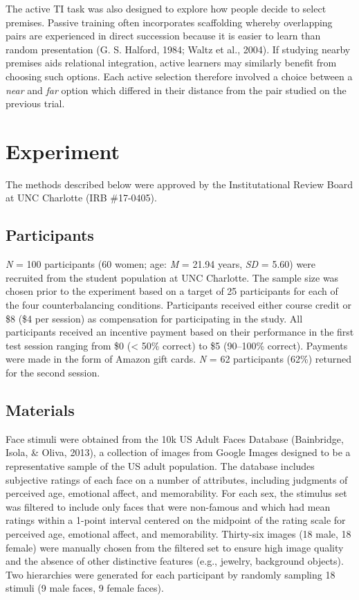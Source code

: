 \documentclass[floatsintext,man]{apa6}
\theoremstyle{definition}
\theoremstyle{definition}
\theoremstyle{definition}
\theoremstyle{remark}
\begin{document}
The active TI task was also designed to explore how people decide to
select premises. Passive training often incorporates scaffolding whereby
overlapping pairs are experienced in direct succession because it is
easier to learn than random presentation (G. S. Halford, 1984; Waltz et
al., 2004). If studying nearby premises aids relational integration,
active learners may similarly benefit from choosing such options. Each
active selection therefore involved a choice between a \emph{near} and
\emph{far} option which differed in their distance from the pair studied
on the previous trial.

\section{Experiment}\label{experiment}

The methods described below were approved by the Institutational Review
Board at UNC Charlotte (IRB \#17-0405).

\subsection{Participants}\label{participants}

\emph{N} = 100 participants (60 women; age: \emph{M} = 21.94 years,
\emph{SD} = 5.60) were recruited from the student population at UNC
Charlotte. The sample size was chosen prior to the experiment based on a
target of 25 participants for each of the four counterbalancing
conditions. Participants received either course credit or \$8 (\$4 per
session) as compensation for participating in the study. All
participants received an incentive payment based on their performance in
the first test session ranging from \$0 (\textless{} 50\% correct) to
\$5 (90--100\% correct). Payments were made in the form of Amazon gift
cards. \emph{N} = 62 participants (62\%) returned for the second
session.

\subsection{Materials}\label{materials}

Face stimuli were obtained from the 10k US Adult Faces Database
(Bainbridge, Isola, \& Oliva, 2013), a collection of images from Google
Images designed to be a representative sample of the US adult
population. The database includes subjective ratings of each face on a
number of attributes, including judgments of perceived age, emotional
affect, and memorability. For each sex, the stimulus set was filtered to
include only faces that were non-famous and which had mean ratings
within a 1-point interval centered on the midpoint of the rating scale
for perceived age, emotional affect, and memorability. Thirty-six images
(18 male, 18 female) were manually chosen from the filtered set to
ensure high image quality and the absence of other distinctive features
(e.g., jewelry, background objects). Two hierarchies were generated for
each participant by randomly sampling 18 stimuli (9 male faces, 9 female
faces).
\end{document}
